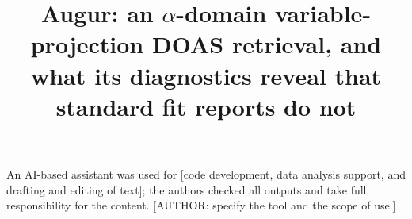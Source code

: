 \documentclass[amt, manuscript]{copernicus}
\begin{document}
\title{Augur: an $\alpha$-domain variable-projection DOAS retrieval, and what its diagnostics reveal that standard fit reports do not}




\received{}
\pubdiscuss{}
\revised{}
\accepted{}
\published{}


\maketitle














\appendix




\noappendix



\begin{acknowledgements}
An AI-based assistant was used for [code development, data analysis support, and drafting and editing of text];
the authors checked all outputs and take full responsibility for the content. [AUTHOR: specify the tool and the scope of use.]
\end{acknowledgements}



\end{document}

